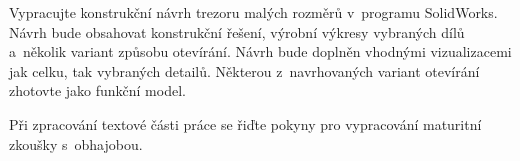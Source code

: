 

Vypracujte konstrukční návrh trezoru malých rozměrů v~programu SolidWorks. Návrh bude obsahovat 
konstrukční řešení, výrobní výkresy vybraných dílů a~několik variant způsobu otevírání. 
Návrh bude doplněn vhodnými vizualizacemi jak celku, tak vybraných detailů. Některou z~navrhovaných 
variant otevírání zhotovte jako funkční model. 

Při zpracování textové části práce se řiďte pokyny pro vypracování maturitní zkoušky s~obhajobou. 